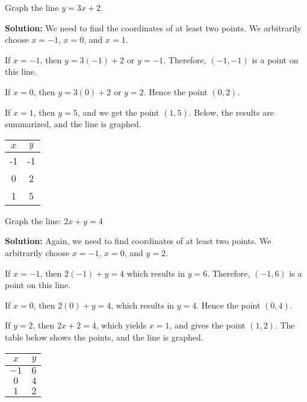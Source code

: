 \begin{example}
Graph the line \(y = 3x + 2\).
\end{example}

\textbf{Solution:} We need to find the coordinates of at least two points. We arbitrarily choose \(x = -1\), \(x = 0\), and \(x = 1\).

If \(x = -1\), then \(y = 3(-1) + 2\) or \(y = -1\). Therefore, \((-1, -1)\) is a point on this line.

If \(x = 0\), then \(y = 3(0) + 2\) or \(y = 2\). Hence the point \((0, 2)\).

If \(x = 1\), then \(y = 5\), and we get the point \((1, 5)\). Below, the results are summarized, and the line is graphed.

\begin{center}
\begin{tabular}{c|c}
    \(x\) & \(y\) \\
    \hline
    -1 & -1 \\
    0  & 2  \\
    1  & 5
\end{tabular}
\end{center}



\begin{example}
Graph the line: $2x + y = 4$
\end{example}

\textbf{Solution:} Again, we need to find coordinates of at least two points. We arbitrarily choose $x = -1$, $x = 0$, and $y = 2$.

If $x = -1$, then $2(-1) + y = 4$ which results in $y = 6$. Therefore, $(-1, 6)$ is a point on this line.

If $x = 0$, then $2(0) + y = 4$, which results in $y = 4$. Hence the point $(0, 4)$.

If $y = 2$, then $2x + 2 = 4$, which yields $x = 1$, and gives the point $(1, 2)$. The table below shows the points, and the line is graphed.


\begin{center}
\begin{tabular}{c|c}
    $x$ & $y$ \\
    \hline
    $-1$ & $6$ \\
    $0$  & $4$ \\
    $1$  & $2$
\end{tabular}
\end{center}

